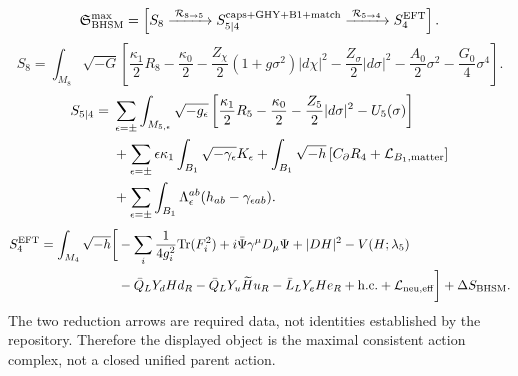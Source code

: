 \[
\mathfrak S_{\rm BHSM}^{\max} =
\left[
S_{8}
\xrightarrow{\;\mathcal R_{8\to5}\;}
S_{5|4}^{\rm caps+GHY+B1+match}
\xrightarrow{\;\mathcal R_{5\to4}\;}
S_{4}^{\rm EFT}
\right].
\]
\[
S_8=\int_{M_8}\!\sqrt{-G}\left[
\frac{\kappa_1}{2}R_8-\frac{\kappa_0}{2}
-\frac{Z_\chi}{2}(1+g\sigma^2)|d\chi|^2
-\frac{Z_\sigma}{2}|d\sigma|^2
-\frac{A_0}{2}\sigma^2-\frac{G_0}{4}\sigma^4\right].
\]
\[
\begin{aligned}
S_{5|4}={}&\sum_{\epsilon=\pm}\int_{M_{5,\epsilon}}\sqrt{-g_\epsilon}
\left[\frac{\kappa_1}{2}R_5-\frac{\kappa_0}{2}
-\frac{Z_5}{2}|d\sigma|^2-U_5(\sigma)\right]\\
&+\sum_{\epsilon=\pm}\epsilon\kappa_1\int_{B_1}\sqrt{-\gamma_\epsilon}K_\epsilon
+\int_{B_1}\sqrt{-h}\,[C_\partial R_4+\mathcal L_{B_1,\rm matter}]\\
&+\sum_{\epsilon=\pm}\int_{B_1}\Lambda_\epsilon^{ab}
(h_{ab}-\gamma_{\epsilon ab}).
\end{aligned}
\]
\[
\begin{aligned}
S_4^{\rm EFT}=\int_{M_4}\sqrt{-h}\bigg[
&-\sum_i\frac{1}{4g_i^2}{\rm Tr}(F_i^2)
+i\bar\Psi\gamma^\mu D_\mu\Psi+|D H|^2-V(H;\lambda_5)\\
&-\bar Q_LY_dHd_R-\bar Q_LY_u\widetilde H u_R
-\bar L_LY_eHe_R+\mathrm{h.c.}
+\mathcal L_{\rm neu,eff}\bigg]+\Delta S_{\rm BHSM}.
\end{aligned}
\]
The two reduction arrows are required data, not identities established by
the repository.  Therefore the displayed object is the maximal consistent
action complex, not a closed unified parent action.
